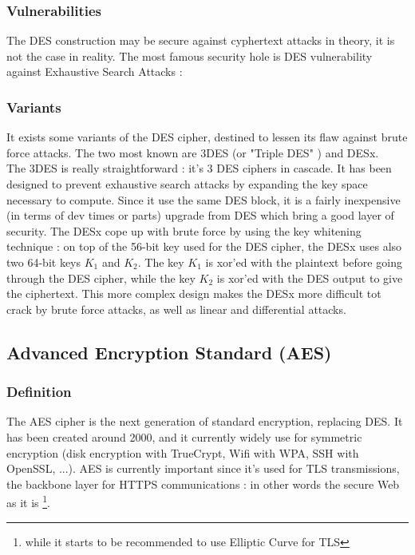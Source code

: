 \subsubsection{ Vulnerabilities }

The DES construction may be secure against cyphertext attacks in theory, it is not the case in reality. The most famous security hole is DES vulnerability against Exhaustive Search Attacks : 	

\subsubsection{Variants}

It exists some variants of the DES cipher, destined to lessen its flaw against brute force attacks. The two most known are 3DES (or "Triple DES" ) and DESx. \\
The 3DES is really straightforward : it's 3 DES ciphers in cascade. It has been designed to prevent exhaustive search attacks by expanding the key space necessary to compute. Since it use the same DES block, it is a fairly inexpensive (in terms of dev times or parts) upgrade from DES which bring a good layer of security.
The DESx cope up with brute force by using the key whitening technique : on top of the 56-bit key used for the DES cipher, the DESx uses also two 64-bit keys $K_1$ and $K_2$. The key $K_1$ is xor'ed with the plaintext before going through the DES cipher, while the key $K_2$ is xor'ed with the DES output to give the ciphertext. This more complex design makes the DESx more difficult tot crack by brute force attacks, as well as linear and differential attacks.

\subsection{Advanced Encryption Standard (AES)}

\subsubsection{Definition}

The AES cipher is the next generation of standard encryption, replacing DES. It has been created around 2000, and it currently widely use for symmetric encryption (disk encryption with TrueCrypt, Wifi with WPA, SSH with OpenSSL, ...). AES is currently important since it's used for TLS transmissions, the backbone layer for HTTPS communications : in other words the secure Web as it is \footnote{while it starts to be recommended to use Elliptic Curve for TLS}.

